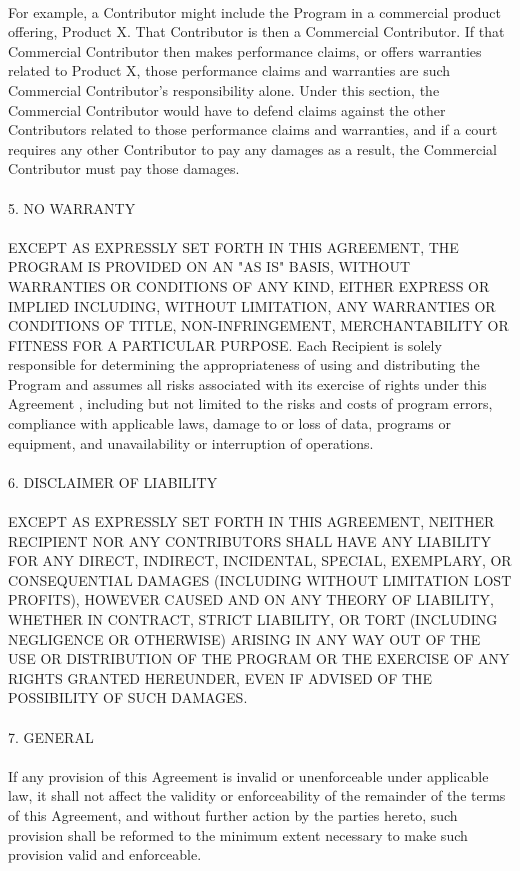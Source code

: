 \documentclass[a4paper, 12pt]{book}
\begin{document}
\\
For example, a Contributor might include the Program in a commercial product offering, Product X. That Contributor is then a Commercial Contributor. If that Commercial Contributor then makes performance claims, or offers warranties related to Product X, those performance claims and warranties are such Commercial Contributor's responsibility alone. Under this section, the Commercial Contributor would have to defend claims against the other Contributors related to those performance claims and warranties, and if a court requires any other Contributor to pay any damages as a result, the Commercial Contributor must pay those damages.\\
\\
5. NO WARRANTY\\
\\
EXCEPT AS EXPRESSLY SET FORTH IN THIS AGREEMENT, THE PROGRAM IS PROVIDED ON AN "AS IS" BASIS, WITHOUT WARRANTIES OR CONDITIONS OF ANY KIND, EITHER EXPRESS OR IMPLIED INCLUDING, WITHOUT LIMITATION, ANY WARRANTIES OR CONDITIONS OF TITLE, NON-INFRINGEMENT, MERCHANTABILITY OR FITNESS FOR A PARTICULAR PURPOSE. Each Recipient is solely responsible for determining the appropriateness of using and distributing the Program and assumes all risks associated with its exercise of rights under this Agreement , including but not limited to the risks and costs of program errors, compliance with applicable laws, damage to or loss of data, programs or equipment, and unavailability or interruption of operations.\\
\\
6. DISCLAIMER OF LIABILITY\\
\\
EXCEPT AS EXPRESSLY SET FORTH IN THIS AGREEMENT, NEITHER RECIPIENT NOR ANY CONTRIBUTORS SHALL HAVE ANY LIABILITY FOR ANY DIRECT, INDIRECT, INCIDENTAL, SPECIAL, EXEMPLARY, OR CONSEQUENTIAL DAMAGES (INCLUDING WITHOUT LIMITATION LOST PROFITS), HOWEVER CAUSED AND ON ANY THEORY OF LIABILITY, WHETHER IN CONTRACT, STRICT LIABILITY, OR TORT (INCLUDING NEGLIGENCE OR OTHERWISE) ARISING IN ANY WAY OUT OF THE USE OR DISTRIBUTION OF THE PROGRAM OR THE EXERCISE OF ANY RIGHTS GRANTED HEREUNDER, EVEN IF ADVISED OF THE POSSIBILITY OF SUCH DAMAGES.\\
\\
7. GENERAL\\
\\
If any provision of this Agreement is invalid or unenforceable under applicable law, it shall not affect the validity or enforceability of the remainder of the terms of this Agreement, and without further action by the parties hereto, such provision shall be reformed to the minimum extent necessary to make such provision valid and enforceable.\\
\end{document}
